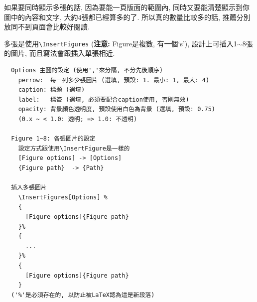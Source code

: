 \newpage
{}

  如果要同時顯示多張的話, 因為要能一頁版面的範圍內, 同時又要能清楚顯示到你圖中的內容和文字, 大約4張都已經算多的了. 所以真的數量比較多的話, 推薦分別放同不到頁面會比較好閱讀.

  多張是使用\verb|\InsertFigures| ({\bf 注意:} Figure是複數, 有一個`s'), 設計上可插入1$\sim$8張的圖片, 而且寫法會跟插入單張相近.\\

  \begin{DescriptionFrame}
  \begin{verbatim}
  Options 主圖的設定 (使用','來分隔, 不分先後順序)
    perrow:  每一列多少張圖片 (選填, 預設: 1. 最小: 1, 最大: 4)
    caption: 標題 (選填)
    label:   標簽 (選填, 必須要配合caption使用, 否則無效)
    opacity: 背景顏色透明度, 預設使用白色為背景 (選填, 預設: 0.75)
    (0.x ~ < 1.0: 透明; => 1.0: 不透明)

  Figure 1~8: 各張圖片的設定
    設定方式跟使用\InsertFigure是一樣的
    [Figure options] -> [Options]
    {Figure path}  -> {Path}

  插入多張圖片
    \InsertFigures[Options] %
    {
      [Figure options]{Figure path}
    }%
    {
      ...
    }%
    {
      [Figure options]{Figure path}
    }
  ('%'是必須存在的, 以防止被LaTeX認為這是新段落)
  \end{verbatim}
  \end{DescriptionFrame}

  \newpage

